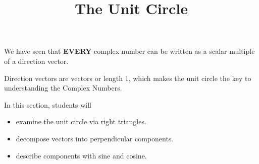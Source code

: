 \documentclass{ximera}
\title{The Unit Circle}
\begin{document}
\begin{abstract}
\end{abstract}
\maketitle


We have seen that \textbf{\textcolor{purple!85!blue}{EVERY}} complex number can be written as a scalar multiple of a direction vector.

Direction vectors are vectors or length $1$, which makes the unit circle the key to understanding the Complex Numbers.






\begin{sectionOutcomes}
In this section, students will 

\begin{itemize}
\item examine the unit circle via right triangles.
\item decompose vectors into perpendicular components.
\item describe components with sine and cosine.
\end{itemize}
\end{sectionOutcomes}
\end{document}
